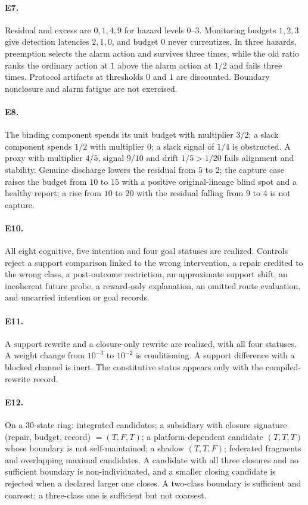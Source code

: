 \paragraph{E7.} Residual and excess are $0, 1, 4, 9$ for hazard levels $0$--$3$. Monitoring budgets
$1, 2, 3$ give detection latencies $2, 1, 0$, and budget $0$ never currentizes. In three hazards,
preemption selects the alarm action and survives three times, while the old ratio ranks the ordinary
action at $1$ above the alarm action at $1/2$ and fails three times. Protocol artifacts at thresholds
$0$ and $1$ are discounted. Boundary nonclosure and alarm fatigue are not exercised.

\paragraph{E8.} The binding component spends its unit budget with multiplier $3/2$; a slack
component spends $1/2$ with multiplier $0$; a slack signal of $1/4$ is obstructed. A proxy with
multiplier $4/5$, signal $9/10$ and drift $1/5 > 1/20$ fails alignment and stability. Genuine discharge
lowers the residual from $5$ to $2$; the capture case raises the budget from $10$ to $15$ with a
positive original-lineage blind spot and a healthy report; a rise from $10$ to $20$ with the residual
falling from $9$ to $4$ is not capture.

\paragraph{E10.} All eight cognitive, five intention and four goal statuses are realized. Controls
reject a support comparison linked to the wrong intervention, a repair credited to the wrong class, a
post-outcome restriction, an approximate support shift, an incoherent future probe, a reward-only
explanation, an omitted route evaluation, and uncarried intention or goal records.

\paragraph{E11.} A support rewrite and a closure-only rewrite are realized, with all four statuses.
A weight change from $10^{-3}$ to $10^{-2}$ is conditioning. A support difference with a blocked
channel is inert. The constitutive status appears only with the compiled-rewrite record.

\paragraph{E12.} On a $30$-state ring: integrated candidates; a subsidiary with closure signature
(repair, budget, record) $= (T, F, T)$; a platform-dependent candidate $(T, T, T)$ whose boundary is
not self-maintained; a shadow $(T, T, F)$; federated fragments and overlapping maximal candidates. A
candidate with all three closures and no sufficient boundary is non-individuated, and a smaller
closing candidate is rejected when a declared larger one closes. A two-class boundary is sufficient
and coarsest; a three-class one is sufficient but not coarsest.

